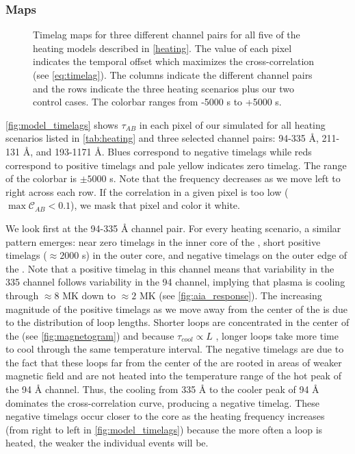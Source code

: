 \subsubsection{Maps}\label{timelag_maps}

\begin{figure*}
    \caption{Timelag maps for three different channel pairs for all five of the heating models described in \autoref{heating}. The value of each pixel indicates the temporal offset which maximizes the cross-correlation (see \autoref{eq:timelag}). The columns indicate the different channel pairs and the rows indicate the three heating scenarios plus our two control cases. The colorbar ranges from -5000 s to +5000 s.}
    \label{fig:model_timelags}
\end{figure*}

\autoref{fig:model_timelags} shows $\tau_{AB}$ in each pixel of our simulated \AR{} for all heating scenarios listed in \autoref{tab:heating} and three selected channel pairs: 94-335 \AA{}, 211-131 \AA{}, and 193-1171 \AA{}. Blues correspond to negative timelags while reds correspond to positive timelags and pale yellow indicates zero timelag. The range of the colorbar is $\pm5000$ s. Note that the frequency decreases as we move left to right across each row. If the correlation in a given pixel is too low ($\max{\mathcal{C}_{AB}}<0.1$), we mask that pixel and color it white. 

We look first at the 94-335 \AA{} channel pair. For every heating scenario, a similar pattern emerges: near zero timelags in the inner core of the \AR{}, short positive timelags ($\approx2000$ s) in the outer core, and negative timelags on the outer edge of the \AR{}. Note that a positive timelag in this channel means that variability in the 335 channel follows variability in the 94 channel, implying that plasma is cooling through $\approx8$ MK down to $\approx2$ MK (see \autoref{fig:aia_response}). The increasing magnitude of the positive timelags as we move away from the center of the \AR{} is due to the distribution of loop lengths. Shorter loops are concentrated in the center of the \AR{} (see \autoref{fig:magnetogram}) and because $\tau_{cool}\propto L$ \citep[see Appendix of][]{cargill_active_2014}, longer loops take more time to cool through the same temperature interval. The negative timelags are due to the fact that these loops far from the center of the \AR{} are rooted in areas of weaker magnetic field and are not heated into the temperature range of the hot peak of the 94 \AA{} channel. Thus, the cooling from 335 \AA{} to the cooler peak of 94 \AA{} dominates the cross-correlation curve, producing a negative timelag. These negative timelags occur closer to the core as the heating frequency increases (from right to left in \autoref{fig:model_timelags}) because the more often a loop is heated, the weaker the individual events will be. 

